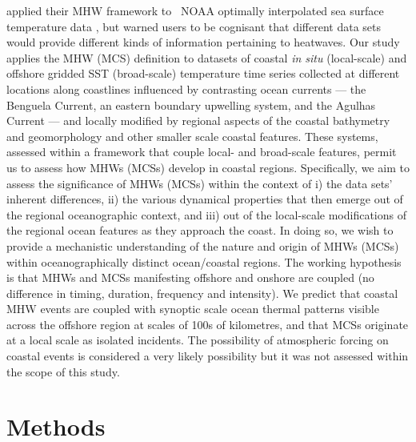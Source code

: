 \documentclass[a4paper,10pt,review]{elsarticle}
\begin{document}
\citet{Hobday2016} applied their MHW framework to \degree~NOAA optimally interpolated sea surface temperature data \citep[hereafter referred to as OISST;][]{Reynolds2007}, but warned users to be cognisant that different data sets would provide different kinds of information pertaining to heatwaves. Our study applies the MHW (MCS) definition to datasets of coastal \emph{in situ} (local-scale) and offshore gridded SST (broad-scale) temperature time series collected at different locations along coastlines influenced by contrasting ocean currents --- the Benguela Current, an eastern boundary upwelling system, and the Agulhas Current --- and locally modified by regional aspects of the coastal bathymetry and geomorphology and other smaller scale coastal features. These systems, assessed within a framework that couple local- and broad-scale features, permit us to assess how MHWs (MCSs) develop in coastal regions. Specifically, we aim to assess the significance of MHWs (MCSs) within the context of i) the data sets’ inherent differences, ii) the various dynamical properties that then emerge out of the regional oceanographic context, and iii) out of the local-scale modifications of the regional ocean features as they approach the coast. In doing so, we wish to provide a mechanistic understanding of the nature and origin of MHWs (MCSs) within oceanographically distinct ocean/coastal regions. The working hypothesis is that MHWs and MCSs manifesting offshore and onshore are coupled (no difference in timing, duration, frequency and intensity). We predict that coastal MHW events are coupled with synoptic scale ocean thermal patterns visible across the offshore region at scales of 100s of kilometres, and that MCSs originate at a local scale as isolated incidents. The possibility of atmospheric forcing on coastal events is considered a very likely possibility but it was not assessed within the scope of this study.

\section{Methods}
\end{document}
